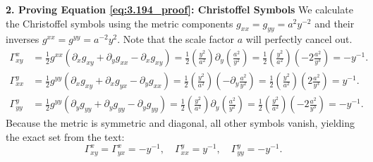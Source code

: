 \documentclass[11pt, a4paper]{report}
\begin{document}
\textbf{2. Proving Equation \eqref{eq:3.194_proof}: Christoffel Symbols}
We calculate the Christoffel symbols using the metric components $g_{xx} = g_{yy} = a^2 y^{-2}$ and their inverses $g^{xx} = g^{yy} = a^{-2} y^2$. Note that the scale factor $a$ will perfectly cancel out.
\begin{align*}
\Gamma^x_{xy} &= \frac{1}{2} g^{xx} (\partial_x g_{xy} + \partial_y g_{xx} - \partial_x g_{xy}) = \frac{1}{2} \left(\frac{y^2}{a^2}\right) \partial_y \left(\frac{a^2}{y^2}\right) = \frac{1}{2} \left(\frac{y^2}{a^2}\right) \left(-2\frac{a^2}{y^3}\right) = -y^{-1}. \\
\Gamma^y_{xx} &= \frac{1}{2} g^{yy} (\partial_x g_{xy} + \partial_x g_{yx} - \partial_y g_{xx}) = \frac{1}{2} \left(\frac{y^2}{a^2}\right) \left(-\partial_y \frac{a^2}{y^2}\right) = \frac{1}{2} \left(\frac{y^2}{a^2}\right) \left(2\frac{a^2}{y^3}\right) = y^{-1}. \\
\Gamma^y_{yy} &= \frac{1}{2} g^{yy} (\partial_y g_{yy} + \partial_y g_{yy} - \partial_y g_{yy}) = \frac{1}{2} \left(\frac{y^2}{a^2}\right) \partial_y \left(\frac{a^2}{y^2}\right) = \frac{1}{2} \left(\frac{y^2}{a^2}\right) \left(-2\frac{a^2}{y^3}\right) = -y^{-1}.
\end{align*}
Because the metric is symmetric and diagonal, all other symbols vanish, yielding the exact set from the text:
\begin{equation}
\Gamma^x_{xy} = \Gamma^x_{yx} = -y^{-1}, \quad \Gamma^y_{xx} = y^{-1}, \quad \Gamma^y_{yy} = -y^{-1}. \label{eq:3.194_proof}
\end{equation}
\end{document}
